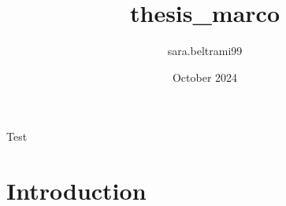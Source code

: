 \documentclass{article}
\title{thesis_marco}
\author{sara.beltrami99 }
\date{October 2024}
\begin{document}
Test

\section{Introduction}
\end{document}
